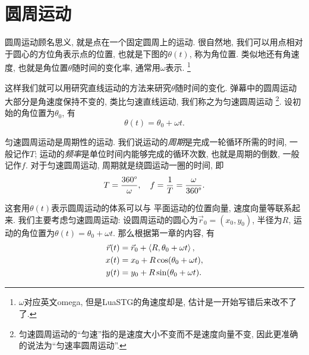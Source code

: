 \section{圆周运动} \label{sec:curve-circle}

圆周运动顾名思义, 就是点在一个固定圆周上的运动.
很自然地, 我们可以用点相对于圆心的方位角表示点的位置,
也就是下图的$\theta(t)$, 称为角位置.
类似地还有角速度, 也就是角位置$\theta$随时间的变化率,
通常用$\omega$表示.
\footnote{$\omega$对应英文omega,
  但是LuaSTG的角速度却是,
  估计是一开始写错后来改不了了.}

\begin{center}
\end{center}

这样我们就可以用研究直线运动的方法来研究$\theta$随时间的变化.
弹幕中的圆周运动大部分是角速度保持不变的,
类比匀速直线运动, 我们称之为匀速圆周运动
\footnote{匀速圆周运动的``匀速''指的是速度大小不变而不是速度向量不变,
  因此更准确的说法为``匀速率圆周运动''.}.
设初始的角位置为$\theta_0$, 有
\[\theta(t) = \theta_0 + \omega t.\]

匀速圆周运动是周期性的运动.
我们说运动的\emph{周期}是完成一轮循环所需的时间, 一般记作$T$;
运动的\emph{频率}是单位时间内能够完成的循环次数,
也就是周期的倒数, 一般记作$f$.
对于匀速圆周运动, 周期就是绕圆运动一圈的时间, 即
\[
  T = \dfrac{360\degree}{\omega},\quad
  f = \dfrac{1}{T} = \dfrac{\omega}{360\degree}.
\]

这套用$\theta(t)$表示圆周运动的体系可以与
平面运动的位置向量, 速度向量等联系起来.
我们主要考虑匀速圆周运动:
设圆周运动的圆心为$\vec r_0=(x_0,y_0)$, 半径为$R$,
运动的角位置为$\theta(t) = \theta_0 + \omega t$.
那么根据第一章的内容, 有
\begin{align*}
  \vec r(t) & = \vec r_0 + \braket{R,\theta_0 + \omega t}, \\
  x(t)      & = x_0 + R\cos(\theta_0 + \omega t),          \\
  y(t)      & = y_0 + R\sin(\theta_0 + \omega t).
\end{align*}

